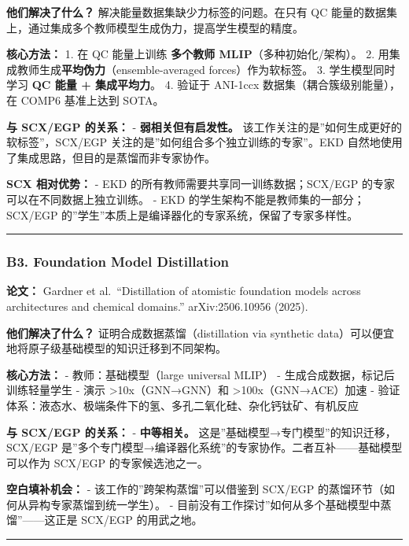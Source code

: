 \documentclass[
  12pt,
]{ctexart}
\begin{document}
\textbf{他们解决了什么？} 解决能量数据集缺少力标签的问题。在只有 QC
能量的数据集上，通过集成多个教师模型生成伪力，提高学生模型的精度。

\textbf{核心方法：} 1. 在 QC 能量上训练 \textbf{多个教师
MLIP}（多种初始化/架构）。 2.
用集成教师生成\textbf{平均伪力}（ensemble-averaged forces）作为软标签。
3. 学生模型同时学习 \textbf{QC 能量 + 集成平均力}。 4. 验证于 ANI-1ccx
数据集（耦合簇级别能量），在 COMP6 基准上达到 SOTA。

\textbf{与 SCX/EGP 的关系：} - \textbf{弱相关但有启发性。}
该工作关注的是''如何生成更好的软标签''，SCX/EGP
关注的是''如何组合多个独立训练的专家''。EKD
自然地使用了集成思路，但目的是蒸馏而非专家协作。

\textbf{SCX 相对优势：} - EKD 的所有教师需要共享同一训练数据；SCX/EGP
的专家可以在不同数据上独立训练。 - EKD
的学生架构不能是教师集的一部分；SCX/EGP
的''学生''本质上是编译器化的专家系统，保留了专家多样性。

\begin{center}\rule{0.5\linewidth}{0.5pt}\end{center}

\subsubsection{B3. Foundation Model
Distillation}\label{b3.-foundation-model-distillation}

\textbf{论文：} Gardner et al.~``Distillation of atomistic foundation
models across architectures and chemical domains.'' arXiv:2506.10956
(2025).

\textbf{他们解决了什么？} 证明合成数据蒸馏（distillation via synthetic
data）可以便宜地将原子级基础模型的知识迁移到不同架构。

\textbf{核心方法：} - 教师：基础模型（large universal MLIP） -
生成合成数据，标记后训练轻量学生 - 演示 \textgreater10x（GNN→GNN）和
\textgreater100x（GNN→ACE）加速 -
验证体系：液态水、极端条件下的氢、多孔二氧化硅、杂化钙钛矿、有机反应

\textbf{与 SCX/EGP 的关系：} - \textbf{中等相关。}
这是''基础模型→专门模型''的知识迁移，SCX/EGP
是''多个专门模型→编译器化系统''的专家协作。二者互补------基础模型可以作为
SCX/EGP 的专家候选池之一。

\textbf{空白填补机会：} - 该工作的''跨架构蒸馏''可以借鉴到 SCX/EGP
的蒸馏环节（如何从异构专家蒸馏到统一学生）。 -
目前没有工作探讨''如何从多个基础模型中蒸馏''------这正是 SCX/EGP
的用武之地。

\begin{center}\rule{0.5\linewidth}{0.5pt}\end{center}
\end{document}
